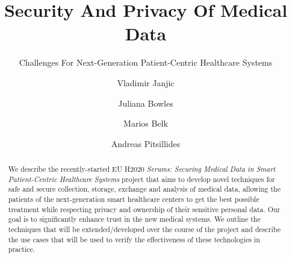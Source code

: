 \documentclass[sigconf]{acmart}
\begin{document}
\title{Security And Privacy Of Medical Data}
\subtitle{Challenges For Next-Generation Patient-Centric Healthcare Systems}



\author{Vladimir Janjic}
\author{Juliana Bowles}

\author{Marios Belk}
\author{Andreas Pitsillides}

\renewcommand{\shortauthors}{Janjic, Bowles, Belk and Pitsilides}

%
\begin{abstract}
  We describe the recently-started EU H2020 \emph{Serums: Securing Medical Data in Smart Patient-Centric Healthcare Systems} project that aims to develop novel techniques for safe and secure collection, storage, exchange and analysis of medical data, allowing the patients of the next-generation smart healthcare centers to get the best possible treatment while respecting privacy and ownership of their sensitive personal data. Our goal is to significantly enhance trust in the new medical systems. We outline the techniques that will be extended/developed over the course of the project and describe the use cases that will be used to verify the effectiveness of these technologies in practice.
\end{abstract}
\end{document}
